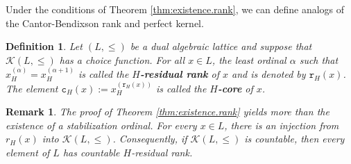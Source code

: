 \documentclass{article}
\newcommand{\comm}[2]{\begin{tcolorbox}[colback=gray!40]\textbf{Comment} (#1) : #2\end{tcolorbox}}
\newtheorem{definition}[theorem]{Definition}
\newtheorem{remark}[theorem]{Remark}
\begin{document}
{Under the conditions of Theorem \ref{thm:existence.rank}, we can define analogs of the Cantor-Bendixson rank and perfect kernel.}

\begin{definition}
Let $(L,\le)$ be a dual algebraic lattice and suppose that $\mathcal{K}(L,\le)$ has a choice function. For all \(x\in L\), the least ordinal \(\alpha\) such that \(x_H^{(\alpha)}=x_H^{(\alpha+1)}\) is called the \textbf{\(H\)-residual rank} of \(x\) and is denoted by \(\texttt{r}_H(x)\). The element \(\texttt{c}_H(x):=x_H^{(\texttt{r}_H(x))}\) is called the \textbf{\(H\)-core} of \(x\).
\end{definition}


\begin{remark}
The proof of Theorem \ref{thm:existence.rank} yields more than the existence of a stabilization ordinal. For every \(x\in L\), there is an injection from \(r_H(x)\) into \(\mathcal K(L,\le)\). Consequently, if \(\mathcal K(L,\le)\) is countable, then every element of \(L\) has countable \(H\)-residual rank.
\end{remark}




\end{document}
